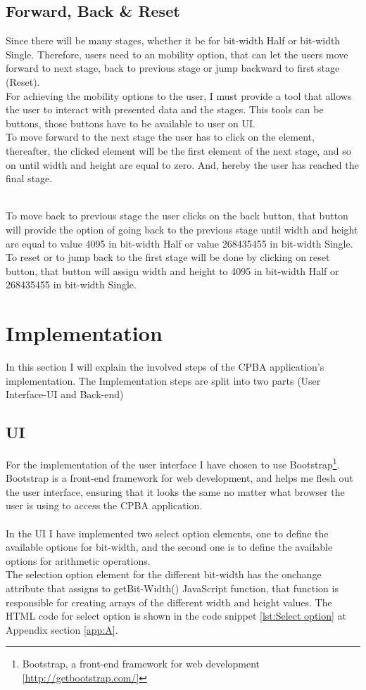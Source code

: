 \documentclass[11pt]{article}
\begin{document}
\subsection{Forward, Back \& Reset}
Since there will be many stages, whether it be for bit-width Half or bit-width Single. Therefore, users need  to an mobility option, that can let the users move forward to next stage, back to previous stage or jump backward to first stage (Reset). \\

For achieving the mobility options to the user, I must provide a tool that allows the user to interact with presented data and the stages. This tools can be buttons, those buttons have to be available to user on UI.\\

To move forward to the next stage the user has to click on the element, thereafter, the clicked element will be the first element of the next stage, and so on until width and height are equal to zero. And, hereby the user has reached the final stage.\\\

To move back to previous stage the user clicks on the back button, that button will provide the option of going back to the previous stage until width and height are equal to value 4095 in bit-width Half or value 268435455 in bit-width Single.\\

To reset or to jump back to the first stage will be done by clicking on reset button, that button will assign width and height to 4095 in bit-width Half or 268435455 in bit-width Single.

\section{Implementation}\label{Implementation}
In this section I will explain the involved steps of the CPBA application's implementation. The Implementation steps are split into two parts (User Interface-UI and Back-end)
\subsection{UI}
For the implementation of the user interface I have chosen to use Bootstrap\footnote{Bootstrap, a front-end framework for web development \ref{http://getbootstrap.com/}}. Bootstrap is a front-end framework for web development, and helps me flesh out the user interface, ensuring that it looks the same no matter what browser the user is using to access the CPBA application.\\\\
In the UI I have implemented two select option elements, one to define the available options for bit-width, and the second one is to define the available options for arithmetic operations.\\
The selection option element for the different bit-width has the onchange attribute that assigns to getBit-Width() JavaScript function, that function is responsible for creating arrays of the different width and height values. The HTML code for select option is shown in the code snippet \ref{lst:Select option} at Appendix section \ref{app:A}.\\
\end{document}
